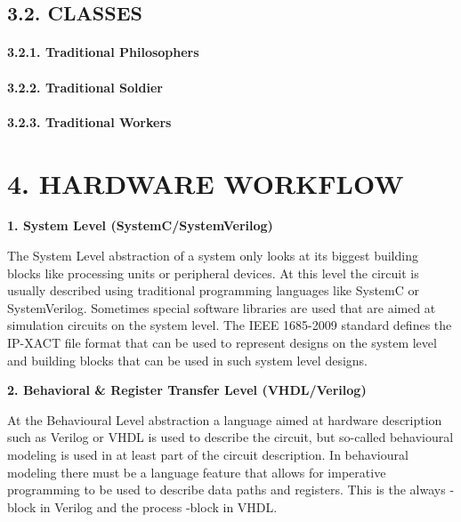 \documentclass[
]{article}
\begin{document}
\hypertarget{classes-1}{%
\subsection{3.2. CLASSES}\label{classes-1}}

\hypertarget{traditional-philosophers-1}{%
\paragraph{3.2.1. Traditional
Philosophers}\label{traditional-philosophers-1}}

\hypertarget{traditional-soldier-1}{%
\paragraph{3.2.2. Traditional Soldier}\label{traditional-soldier-1}}

\hypertarget{traditional-workers-1}{%
\paragraph{3.2.3. Traditional Workers}\label{traditional-workers-1}}

\hypertarget{hardware-workflow-1}{%
\section{4. HARDWARE WORKFLOW}\label{hardware-workflow-1}}

\textbf{1. System Level (SystemC/SystemVerilog)}

The System Level abstraction of a system only looks at its biggest
building blocks like processing units or peripheral devices. At this
level the circuit is usually described using traditional programming
languages like SystemC or SystemVerilog. Sometimes special software
libraries are used that are aimed at simulation circuits on the system
level. The IEEE 1685-2009 standard defines the IP-XACT file format that
can be used to represent designs on the system level and building blocks
that can be used in such system level designs.

\textbf{2. Behavioral \& Register Transfer Level (VHDL/Verilog)}

At the Behavioural Level abstraction a language aimed at hardware
description such as Verilog or VHDL is used to describe the circuit, but
so-called behavioural modeling is used in at least part of the circuit
description. In behavioural modeling there must be a language feature
that allows for imperative programming to be used to describe data paths
and registers. This is the always -block in Verilog and the process
-block in VHDL.
\end{document}
